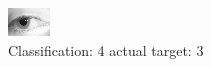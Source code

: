 \begin{figure}[h!]
\begin{center}
\includegraphics[width=0.60\columnwidth]{figures/ID1372_class_4_target_3.png}
\end{center}
\caption{ Classification: 4 actual target: 3}
\label{fig:ID1372_class_4_target_3}
\end{figure}
